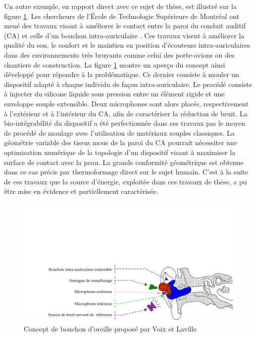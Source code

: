 Un autre exemple, en rapport direct avec ce sujet de thèse, est illustré sur la figure \ref{fig:earplug}. Les chercheurs de l'École de Technologie Supérieure de Montréal ont  mené des travaux visant à améliorer le contact entre la paroi du conduit auditif (CA) et celle d'un bouchon intra-auriculaire \cite{Voix2002}. Ces travaux visent à améliorer la qualité du son, le confort et le maintien en position d'écouteurs intra-auriculaires dans des environnements très bruyants comme celui des porte-avions ou des chantiers de construction. La figure \ref{fig:earplug} montre un aperçu du concept ainsi développé pour répondre à la problématique. Ce dernier consiste à mouler un dispositif adapté à chaque individu de façon intra-auriculaire. Le procédé consiste à injecter du silicone liquide sous pression entre un élément rigide et une enveloppe souple extensible. Deux microphones sont alors placés, respectivement à l'extérieur et à l'intérieur du CA, afin de caractériser la réduction de bruit. La bio-intégrabilité du dispositif a été perfectionnée dans ces travaux pas le moyen de procédé de moulage avec l'utilisation de matériaux souples classiques. La géométrie variable des tissus mous de la paroi du CA pourrait nécessiter une optimisation numérique de la topologie d'un dispositif visant à maximiser la surface de contact avec la peau. La grande conformité géométrique est obtenue dans ce cas précis par thermoformage direct sur le sujet humain. C'est à la suite de ces travaux que la source d'énergie, exploitée dans ces travaux de thèse, a pu être mise en évidence et partiellement caractérisée.
\begin{figure}[!htbp]
	\centering
	\captionsetup{justification=centering}
	\includegraphics[trim={3.8cm 0cm 0cm 10cm},clip, width=\textwidth]{../Chap1/Figure/earplug.pdf}
	\caption{Concept de bouchon d'oreille proposé par Voix et Laville \cite{Voix2002}}
	\label{fig:earplug}
\end{figure}

